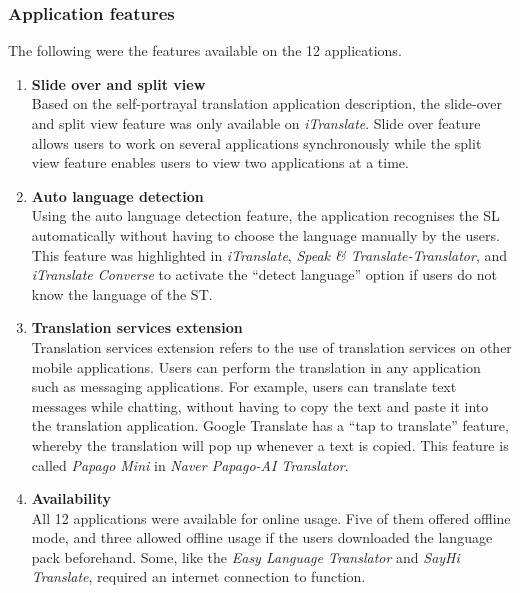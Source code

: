 \documentclass[english]{textolivre}
\begin{document}
\subsubsection{Application features}\label{sec-figuras-tabelas}
The following were the features available on the 12 applications.

\begin{enumerate}
    \item \textbf{Slide over and split view} \\
    Based on the self-portrayal translation application description, the slide-over and split view feature was only available on \textit{iTranslate}. Slide over feature allows users to work on several applications synchronously while the split view feature enables users to view two applications at a time.
    \item \textbf{Auto language detection} \\
    Using the auto language detection feature, the application recognises the SL automatically without having to choose the language manually by the users. This feature was highlighted in \textit{iTranslate}, \textit{Speak \& Translate-Translator}, and \textit{iTranslate Converse} to activate the “detect language” option if users do not know the language of the ST.
    \item \textbf{Translation services extension} \\
    Translation services extension refers to the use of translation services on other mobile applications. Users can perform the translation in any application such as messaging applications. For example, users can translate text messages while chatting, without having to copy the text and paste it into the translation application.  Google Translate has a “tap to translate” feature, whereby the translation will pop up whenever a text is copied. This feature is called \textit{Papago Mini} in \textit{Naver Papago-AI Translator}.
    \item \textbf{Availability} \\
    All 12 applications were available for online usage. Five of them offered offline mode, and three allowed offline usage if the users downloaded the language pack beforehand. Some, like the \textit{Easy Language Translator} and \textit{SayHi Translate}, required an internet connection to function.
\end{enumerate}
    
\end{document}
